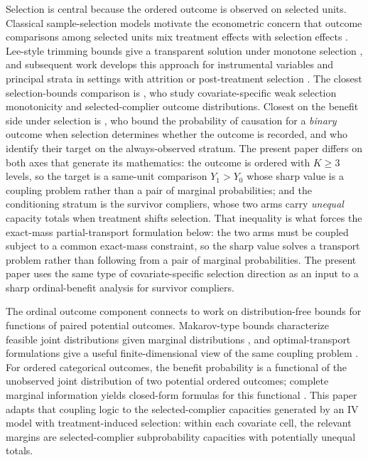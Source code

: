 Selection is central because the ordered outcome is observed on selected units. Classical sample-selection models motivate the econometric concern that outcome comparisons among selected units mix treatment effects with selection effects \citep{Heckman1979}. Lee-style trimming bounds give a transparent solution under monotone selection \citep{Lee2009}, and subsequent work develops this approach for instrumental variables and principal strata in settings with attrition or post-treatment selection \citep{ChenFlores2015,BlancoFloresFloresLagunes2013,ChenFloresFloresLagunes2018,KennedyHarrisKeele2019}. The closest selection-bounds comparison is \citet{DongHeiler2026}, who study covariate-specific weak selection monotonicity and selected-complier outcome distributions. Closest on the benefit side under selection is \citet{PossebomRiva2025}, who bound the probability of causation for a \emph{binary} outcome when selection determines whether the outcome is recorded, and who identify their target on the always-observed stratum. The present paper differs on both axes that generate its mathematics: the outcome is ordered with \(K\ge 3\) levels, so the target is a same-unit comparison \(Y_1>Y_0\) whose sharp value is a coupling problem rather than a pair of marginal probabilities; and the conditioning stratum is the survivor compliers, whose two arms carry \emph{unequal} capacity totals when treatment shifts selection. That inequality is what forces the exact-mass partial-transport formulation below: the two arms must be coupled subject to a common exact-mass constraint, so the sharp value solves a transport problem rather than following from a pair of marginal probabilities. The present paper uses the same type of covariate-specific selection direction as an input to a sharp ordinal-benefit analysis for survivor compliers.

The ordinal outcome component connects to work on distribution-free bounds for functions of paired potential outcomes. Makarov-type bounds characterize feasible joint distributions given marginal distributions \citep{Makarov1982,WilliamsonDowns1990}, and optimal-transport formulations give a useful finite-dimensional view of the same coupling problem \citep{Villani2009,FanPark2010}. For ordered categorical outcomes, the benefit probability is a functional of the unobserved joint distribution of two potential ordered outcomes; complete marginal information yields closed-form formulas for this functional \citep{LuDingDasgupta2018,LuZhangDing2020}. This paper adapts that coupling logic to the selected-complier capacities generated by an IV model with treatment-induced selection: within each covariate cell, the relevant margins are selected-complier subprobability capacities with potentially unequal totals.


